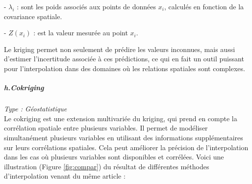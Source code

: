 - \( \lambda_i \) : sont les poids associés aux points de données \( x_i \), calculés en fonction de la covariance spatiale.

\vspace{-0,2 cm}

- \( Z(x_i) \) : est la valeur mesurée au point \( x_i \).

Le kriging permet non seulement de prédire les valeurs inconnues, mais aussi d'estimer l'incertitude associée à ces prédictions, ce qui en fait un outil puissant pour l'interpolation dans des domaines où les relations spatiales sont complexes.




\subparagraph{h.Cokriging \cite{kringing}}
\textit{Type : Géostatistique} \\
\phantom{----}Le cokriging est une extension multivariée du kriging, qui prend en compte la corrélation spatiale entre plusieurs variables. Il permet de modéliser simultanément plusieurs variables en utilisant des informations supplémentaires sur leurs corrélations spatiales. Cela peut améliorer la précision de l'interpolation dans les cas où plusieurs variables sont disponibles et corrélées.
Voici une illustration (Figure \ref{fig:compar}) du résultat de différentes méthodes d'interpolation venant du même article :
